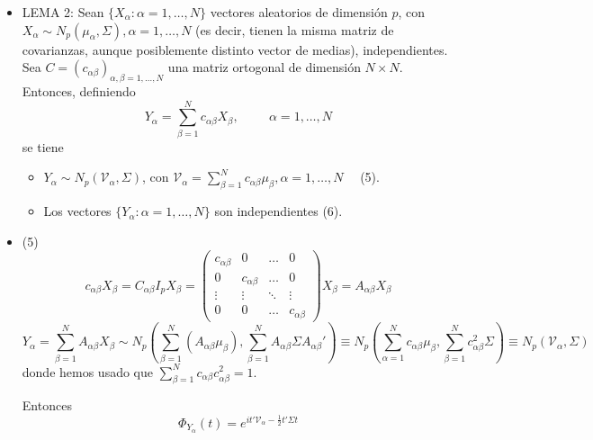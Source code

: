 \documentclass[11pt,a4paper]{article}
\begin{document}
\begin{itemize}
\item LEMA 2: Sean $\{X_{\alpha}: \alpha=1,\dots,N\}$ vectores aleatorios de dimensión $p$, con $X_{\alpha} \sim N_{p}(\mu_{\alpha}, \Sigma), \alpha = 1,\dots,N$ (es decir, tienen la misma matriz de covarianzas, aunque posiblemente distinto vector de medias), independientes. Sea $C = (c_{\alpha\beta})_{\alpha, \beta = 1,\dots,N}$ una matriz ortogonal de dimensión $N \times N$. Entonces, definiendo
$$Y_{\alpha} = \sum_{\beta=1}^{N} c_{\alpha\beta}X_{\beta}, \hspace{1cm} \alpha=1,\dots,N$$
se tiene
\begin{itemize}
\item $Y_{\alpha} \sim N_{p}(\mathcal{V}_{\alpha}, \Sigma)$, con $\mathcal{V}_{\alpha} = \sum_{\beta=1}^{N}c_{\alpha\beta}\mu_{\beta}, \alpha = 1, \dots, N \quad$ (5).
\item Los vectores $\{Y_{\alpha}: \alpha=1,\dots,N\}$ son independientes (6).
\end{itemize}

\item (5) $$c_{\alpha\beta} X_{\beta} = C_{\alpha\beta} I_{p} X_{\beta} = \begin{pmatrix}
c_{\alpha\beta} & 0 & \dots & 0 \\
0 & c_{\alpha\beta} & \dots & 0 \\
\vdots & \vdots & \ddots & \vdots \\
0 & 0 & \dots & c_{\alpha\beta}
\end{pmatrix} X_{\beta} = A_{\alpha\beta} X_{\beta}$$
$$Y_{\alpha} = \sum_{\beta=1}^{N} A_{\alpha\beta} X_{\beta} \sim N_{p}(\sum_{\beta=1}^{N}(A_{\alpha\beta}\mu_{\beta}), \sum_{\beta=1}^{N} A_{\alpha\beta} \Sigma A_{\alpha\beta}') \equiv N_{p}(\sum_{\alpha=1}^{N}c_{\alpha\beta} \mu_{\beta}, \sum_{\beta=1}^{N}c_{\alpha\beta}^{2}\Sigma) \equiv N_{p}(\mathcal{V}_{\alpha}, \Sigma)$$
donde hemos usado que $\sum_{\beta=1}^{N} c_{\alpha\beta} c_{\alpha\beta}^{2}=1$.

Entonces
$$\Phi_{Y_{\alpha}}(t) = e^{it'\mathcal{V}_{\alpha} - \frac{1}{2}t' \Sigma t}$$


\end{itemize}
\end{document}
